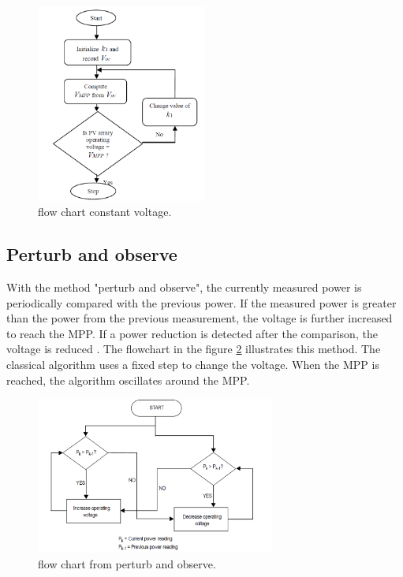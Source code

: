 \begin{figure}[htbp]
	\begin{center}
		\includegraphics[width=0.5\textwidth]{../Pictures/P1/Flow_chart/Flow_chart_constant_voltage}
		\caption{flow chart constant voltage\cite{}. }
		\label{fcconstantvoltage}
	\end{center}	
\end{figure}

\subsection{Perturb and observe}
With the method "perturb and observe", the currently measured power is periodically compared with the previous power. If the measured power is greater than the power from the previous measurement, the voltage is further increased to reach the MPP. If a power reduction is detected after the comparison, the voltage is reduced . The flowchart in the figure \ref{fcperturbandobserve} illustrates this method. The classical algorithm uses a fixed step to change the voltage. When the MPP is reached, the algorithm oscillates around the MPP\cite{}. 

\begin{figure}[htbp]
	\begin{center}
		\includegraphics[width=0.7\textwidth]{../Pictures/P1/Flow_chart/flow_chart_perturb_observe}
		\caption{flow chart from perturb and observe\cite{}.}
		\label{fcperturbandobserve}
	\end{center}	
\end{figure}

